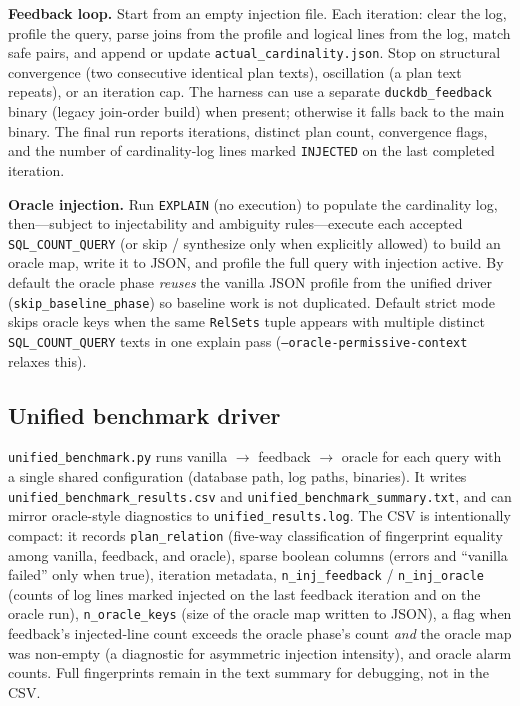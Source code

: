 \documentclass[sigconf,nonacm]{acmart}
\begin{document}
\textbf{Feedback loop.} Start from an empty injection file. Each iteration: clear the log, profile the query, parse joins from the profile and logical lines from the log, match safe pairs, and append or update \texttt{actual\_cardinality.json}. Stop on structural convergence (two consecutive identical plan texts), oscillation (a plan text repeats), or an iteration cap. The harness can use a separate \texttt{duckdb\_feedback} binary (legacy join-order build) when present; otherwise it falls back to the main binary. The final run reports iterations, distinct plan count, convergence flags, and the number of cardinality-log lines marked \texttt{INJECTED} on the last completed iteration.

\textbf{Oracle injection.} Run \texttt{EXPLAIN} (no execution) to populate the cardinality log, then---subject to injectability and ambiguity rules---execute each accepted \texttt{SQL\_COUNT\_QUERY} (or skip / synthesize only when explicitly allowed) to build an oracle map, write it to JSON, and profile the full query with injection active. By default the oracle phase \emph{reuses} the vanilla JSON profile from the unified driver (\texttt{skip\_baseline\_phase}) so baseline work is not duplicated. Default strict mode skips oracle keys when the same \texttt{RelSets} tuple appears with multiple distinct \texttt{SQL\_COUNT\_QUERY} texts in one explain pass (\texttt{--oracle-permissive-context} relaxes this).

\subsection{Unified benchmark driver}

\texttt{unified\_benchmark.py} runs vanilla $\rightarrow$ feedback $\rightarrow$ oracle for each query with a single shared configuration (database path, log paths, binaries). It writes \texttt{unified\_benchmark\_results.csv} and \texttt{unified\_benchmark\_summary.txt}, and can mirror oracle-style diagnostics to \texttt{unified\_results.log}. The CSV is intentionally compact: it records \texttt{plan\_relation} (five-way classification of fingerprint equality among vanilla, feedback, and oracle), sparse boolean columns (errors and ``vanilla failed'' only when true), iteration metadata, \texttt{n\_inj\_feedback} / \texttt{n\_inj\_oracle} (counts of log lines marked injected on the last feedback iteration and on the oracle run), \texttt{n\_oracle\_keys} (size of the oracle map written to JSON), a flag when feedback's injected-line count exceeds the oracle phase's count \emph{and} the oracle map was non-empty (a diagnostic for asymmetric injection intensity), and oracle alarm counts. Full fingerprints remain in the text summary for debugging, not in the CSV.
\end{document}
